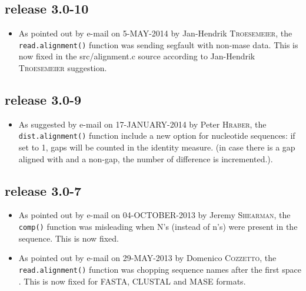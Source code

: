 \documentclass{article}
\begin{document}
\subsection*{release 3.0-10}

\begin{itemize}

\item  As pointed out by e-mail on 5-MAY-2014 by Jan-Hendrik \textsc{Troesemeier}, the  \texttt{read.alignment()} function  was sending segfault with non-mase data. This is now fixed in the src/alignment.c source according to Jan-Hendrik \textsc{Troesemeier} suggestion.

\end{itemize}



\subsection*{release 3.0-9}

\begin{itemize}

\item As suggested by e-mail on 17-JANUARY-2014 by Peter \textsc{Hraber}, the \texttt{dist.alignment()} function include a new  option  for nucleotide sequences:  if set to 1, gaps will be counted in the identity measure. (in case there is a gap aligned with and a non-gap, the number of difference is incremented.).

\end{itemize}



\subsection*{release 3.0-7}

\begin{itemize}

\item As pointed out by e-mail on 04-OCTOBER-2013 by Jeremy \textsc{Shearman}, the  \texttt{comp()} function  was misleading when N's (instead of n's) were present in the sequence.  This is now fixed.

\item As pointed out by e-mail on 29-MAY-2013 by Domenico \textsc{Cozzetto}, the  \texttt{read.alignment()} function was chopping sequence names after the first space .  This is now fixed for FASTA, CLUSTAL and MASE formats.


\end{itemize}
\end{document}
